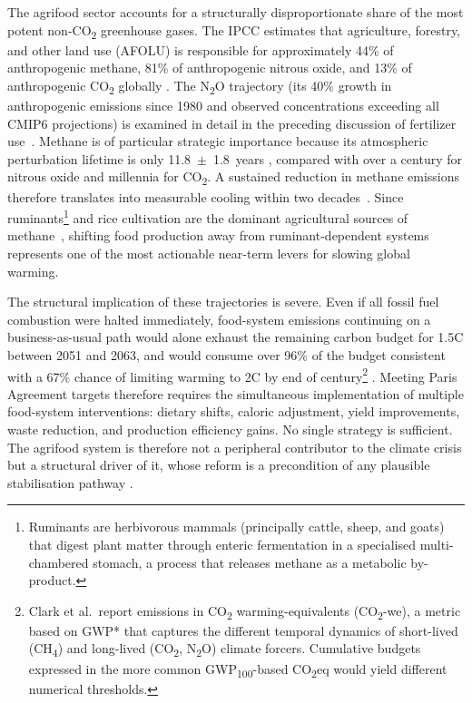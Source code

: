 The agrifood sector accounts for a structurally disproportionate share of the
most potent non-CO\textsubscript{2} greenhouse gases. The IPCC estimates that
agriculture, forestry, and other land use (AFOLU) is responsible for
approximately 44\% of anthropogenic methane, 81\% of anthropogenic
nitrous oxide, and 13\% of anthropogenic CO\textsubscript{2} globally \cite[SPM~A.3]{ipcc2019srccl}. The N\textsubscript{2}O trajectory (its 40\%
growth in anthropogenic emissions since 1980 and observed concentrations exceeding all CMIP6 projections)
is examined in detail in the preceding discussion of fertilizer use~\cite[Abstract]{Tian2024}.
Methane is of particular strategic importance because its atmospheric
perturbation lifetime is only 11.8~$\pm$~1.8~years
\cite[Table~7.15]{Forster_AR6_Ch7_2021}, compared with over a century for
nitrous oxide and millennia for CO\textsubscript{2}. A sustained reduction in
methane emissions therefore translates into measurable cooling within two
decades~\cite[Sections~7.6.1.4--7.6.1.5, Fig.~7.22]{Forster_AR6_Ch7_2021}. Since
ruminants\footnote{Ruminants are herbivorous mammals (principally cattle,
sheep, and goats) that digest plant matter through enteric fermentation in a
specialised multi-chambered stomach, a process that releases methane as a
metabolic by-product.} and rice cultivation are the dominant agricultural
sources of methane~\cite[Section~2.3.2.2]{ipcc2019srccl}, shifting food production
away from ruminant-dependent systems represents one of the most actionable
near-term levers for slowing global warming.

The structural implication of these trajectories is severe. Even if all fossil
fuel combustion were halted immediately, food-system emissions continuing on a
business-as-usual path would alone exhaust the remaining carbon budget for
1.5\textdegree{}C between 2051 and 2063, and would consume over 96\% of the
budget consistent with a 67\% chance of limiting warming to
2\textdegree{}C by end of century\footnote{Clark et al.\ report emissions in
CO\textsubscript{2} warming-equivalents (CO\textsubscript{2}-we), a metric
based on GWP* that captures the different temporal dynamics of short-lived
(CH\textsubscript{4}) and long-lived (CO\textsubscript{2}, N\textsubscript{2}O)
climate forcers. Cumulative budgets expressed in the more common
GWP\textsubscript{100}-based CO\textsubscript{2}eq would yield different
numerical thresholds.} \cite[p.~706, Fig.~1]{clark2020foodclimate}.
Meeting Paris Agreement targets therefore requires the simultaneous
implementation of multiple food-system interventions: dietary shifts,
caloric adjustment, yield improvements, waste reduction, and production
efficiency gains. No single strategy is sufficient. The agrifood system is
therefore not a peripheral contributor to the climate crisis but a structural
driver of it, whose reform is a precondition of any plausible
stabilisation pathway \cite[pp.~706--707, Fig.~2]{clark2020foodclimate}.

